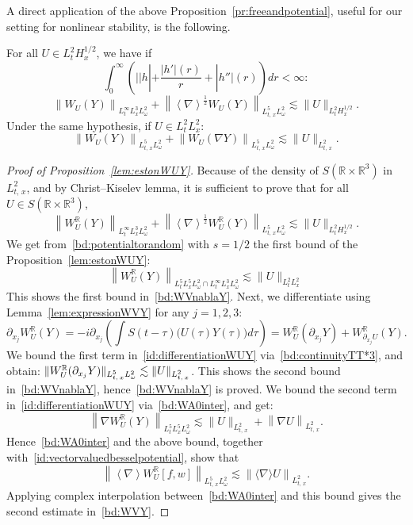 \documentclass[AHL, Unicode, longabstracts,published]{cedram}
\newcommand{\R}{\mathbb{R}}
\begin{document}
A direct application of the above Proposition~\ref{pr:freeandpotential}, useful for our setting for nonlinear stability, is the following.


\begin{prop}\label{lem:estonWUY}
For all $U\in L^2_{t}H^{1/2}_x$, we have if
\[
\int_0^\infty \left(||h|+\frac{|h'|(r)}{r}+|h''|(r)\right)dr<\infty:
\]
\begin{equation} \label{bd:WVY}
\left\|W_U(Y)\right\|_{L^{\infty}_tL^3_xL^2_\omega} +\left\| \left\langle \nabla \right\rangle^{\frac 12} W_U(Y)\right\|_{L^5_{t,\,x}L^2_\omega}\lesssim \|U\|_{L^2_{t}H^{1/2}_x}.
\end{equation}
Under the same hypothesis, if $U\in L^2_{t}L^2_x$:
\begin{equation} \label{bd:WVnablaY}
\left\|W_U(Y)\right\|_{L^5_{t,\,x}L^2_\omega}+\left\|W_U(\nabla Y)\right\|_{L^5_{t,\,x}L^2_\omega}\lesssim \|U\|_{L^2_{t,\,x}}.
\end{equation}
\end{prop}


\begin{proof}[Proof of Proposition~\ref{lem:estonWUY}]
Because of the density of $S(\R\times \R^3)$ in $L^2_{t,\,x}$, and by Christ--Kiselev lemma, it is sufficient to prove that for all $U \in S(\R\times \R^3)$,
\[
\left\| W_{U}^{\R}(Y)\right\|_{L^{\infty}_tL^3_xL^2_\omega}+\left\|\left\langle \nabla \right\rangle^{\frac 12} W_{U}^{\R}(Y)\right\|_{L^5_{t,\,x} L^2_\omega} \lesssim \|U\|_{L^2_{t}H^{1/2}_x}.
\]
We get from~\eqref{bd:potentialtorandom} with $s=1/2$ the first bound of the Proposition~\ref{lem:estonWUY}:
\begin{equation} \label{bd:WA0inter}
\left\|W^{\R}_U(Y)\right\|_{L^5_tL^5_xL^2_\omega\cap L^{\infty}_tL^3_xL^2_\omega}\lesssim \| U\|_{L^2_tL^2_x}
\end{equation}
This shows the first bound in~\eqref{bd:WVnablaY}. Next, we differentiate using Lemma~\ref{lem:expressionWVY} for any $j=1,2,3$:
\begin{equation} \label{id:differentiationWUY}
\partial_{x_j} W^{\R}_U(Y)= -i\partial_{x_j}\left(\int S(t-\tau)\big(U(\tau)Y(\tau)\big)d\tau\right)=W^{\R}_{U}\left(\partial_{x_j}Y\right)+W^{\R}_{\partial_{x_j}U}(Y).
\end{equation}
We bound the first term in~\eqref{id:differentiationWUY} via~\eqref{bd:continuityTT*3}, and obtain: $\| W^{\R}_U(\partial_{x_j}Y)\|_{L^5_{t,\,x}L^2_\omega}\linebreak\lesssim \| U \|_{L^2_{t,\,x}}$. This shows the second bound in~\eqref{bd:WVnablaY}, hence~\eqref{bd:WVnablaY} is proved. We bound the second term in~\eqref{id:differentiationWUY} via~\eqref{bd:WA0inter}, and get:
\[
\left\| \nabla W^{\R}_U(Y)\right\|_{L^5_tL^5_xL^2_\omega}\lesssim \| U\|_{L^2_{t,\,x}}+ \left\| \nabla U\right\|_{L^2_{t,\,x}}.
\]
Hence~\eqref{bd:WA0inter} and the above bound, together with~\eqref{id:vectorvaluedbesselpotential}, show that
\[
\left\| \left\langle \nabla \right\rangle W^{\R}_U\left[f,w\right]\right\|_{L^5_{t,\,x}L^2_\omega}\lesssim \left\| \langle \nabla \rangle U\right\|_{L^2_{t,\,x}}.
\]
Applying complex interpolation between~\eqref{bd:WA0inter} and this bound gives the second estimate in~\eqref{bd:WVY}.
\end{proof}
\end{document}
